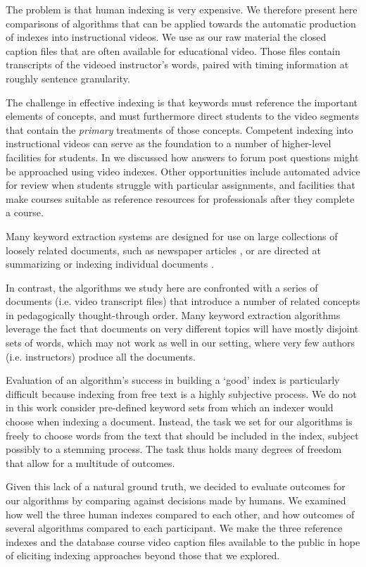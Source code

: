 The problem is that human indexing is very expensive. We therefore
present here comparisons of algorithms that can be applied towards the
automatic production of indexes into instructional videos. We use as
our raw material the closed caption files that are often available for
educational video. Those files contain transcripts of the videoed
instructor's words, paired with timing information at roughly sentence
granularity.

The challenge in effective indexing is that keywords must reference
the important elements of concepts, and must furthermore direct
students to the video segments that contain the {\em primary}
treatments of those concepts. Competent indexing into instructional
videos can serve as the foundation to a number of higher-level
facilities for students. In \cite{agrawal2015} we discussed how
answers to forum post questions might be approached using video
indexes. Other opportunities include automated advice for review when
students struggle with particular assignments, and facilities that
make courses suitable as reference resources for professionals after
they complete a course. 

Many keyword extraction systems are designed for use on large
collections of loosely related documents, such as newspaper articles
\cite{Salton1975}, or are directed at summarizing or indexing
individual documents \cite{ohsawa1998}. 

In contrast, the algorithms we study here are confronted with a series
of documents (i.e. video transcript files) that introduce a number of
related concepts in pedagogically thought-through order. Many keyword
extraction algorithms leverage the fact that documents on very
different topics will have mostly disjoint sets of words, which may
not work as well in our setting, where very few authors
(i.e. instructors) produce all the documents.

Evaluation of an algorithm's success in building a `good' index is
particularly difficult because indexing from free text is a highly
subjective process. We do not in this work consider pre-defined
keyword sets from which an indexer would choose when indexing a
document. Instead, the task we set for our algorithms is freely to
choose words from the text that should be included in the index,
subject possibly to a stemming process. The task thus holds many
degrees of freedom that allow for a multitude of outcomes.

Given this lack of a natural ground truth, we decided to evaluate
outcomes for our algorithms by comparing against decisions made by
humans. We examined how well the three human indexes compared to each
other, and how outcomes of several algorithms compared to each
participant. We make the three reference indexes and the database
course video caption files available to the public in hope of
eliciting indexing approaches beyond those that we explored.


